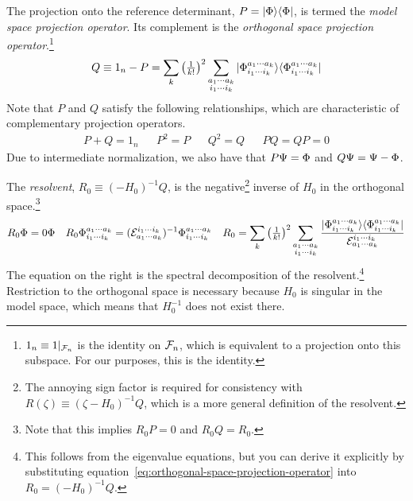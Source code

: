 \documentclass[11pt]{article}
\numberwithin{equation}{section}
\begin{document}
\begin{dfn}
The projection onto the reference determinant, $P=|\Phi \rangle\langle\Phi |$, is termed the \textit{model space projection operator}.
Its complement is the \textit{orthogonal space projection operator}.\footnote{$1_n\equiv 1|_{\mathcal{F}_n}$ is the identity on $\mathcal{F}_n$, which is equivalent to a projection onto this subspace.  For our purposes, this is the identity.}
\begin{align}
\label{eq:orthogonal-space-projection-operator}
  Q
\equiv
  1_n
-
  P
=
  \sum_k
  \left(
    \tfrac{1}{k!}
  \right)^2
  \sum_{\substack{a_1\cdots a_k\\i_1\cdots i_k}}
  |\Phi _{i_1\cdots i_k}^{a_1\cdots a_k}\rangle
  \langle\Phi _{i_1\cdots i_k}^{a_1\cdots a_k}|
\end{align}
Note that $P$ and $Q$ satisfy the following relationships, which are characteristic of complementary projection operators.
\begin{align}
  P
+
  Q
=
  1_n
&&
  P^2
=
  P
&&
  Q^2
=
  Q
&&
  PQ
=
  QP
=
  0
\end{align}
Due to intermediate normalization, we also have that
$
  P\Psi 
=
  \Phi 
$
and
$
  Q\Psi 
=
  \Psi 
-
  \Phi 
$.
\end{dfn}

\begin{samepage}
\begin{dfn}
The \textit{resolvent},
$
  R_0
\equiv
  (-H_0)^{-1}Q
$, is the negative\footnote{The annoying sign factor is required for consistency with $R(\zeta)\equiv(\zeta-H_0)^{-1}Q$, which is a more general definition of the resolvent.} inverse of $H_0$ in the orthogonal space.\footnote{Note that this implies $R_0P=0$ and $R_0Q=R_0$.}
\begin{align}
\label{eq:resolvent-spectral-decomposition}
  R_0
  \Phi 
=
  0
  \Phi 
&&
  R_0
  \Phi _{i_1\cdots i_k}^{a_1\cdots a_k}
=
  (\mathcal{E}_{a_1\cdots a_k}^{i_1\cdots i_k})^{-1}
  \Phi _{i_1\cdots i_k}^{a_1\cdots a_k}
&&
  R_0
=
  \sum_k
  \left(\tfrac{1}{k!}\right)^2
  \sum_{\substack{a_1\cdots a_k\\i_1\cdots i_k}}
  \frac {
    |\Phi _{i_1\cdots i_k}^{a_1\cdots a_k}\rangle
    \langle\Phi _{i_1\cdots i_k}^{a_1\cdots a_k}|
  }{
    \mathcal{E}_{a_1\cdots a_k}^{i_1\cdots i_k}
  }
\end{align}
The equation on the right is the spectral decomposition of the resolvent.\footnote{This follows from the eigenvalue equations, but you can derive it explicitly by substituting equation~\ref{eq:orthogonal-space-projection-operator} into $R_0=(-H_0)^{-1}Q$.}
Restriction to the orthogonal space is necessary because $H_0$ is singular in the model space, which means that $H_0^{-1}$ does not exist there.
\end{dfn}
\end{samepage}
\end{document}
